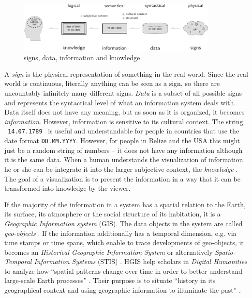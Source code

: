 \begin{figure}[ht]
  \vspace{1em}
  \begin{center}
    \includegraphics[width=0.9\textwidth]{graphics/basics/hgis/information}
  \end{center}
  \caption{signs, data, information and knowledge}
  \label{fig:information}
\end{figure}

A \emph{sign} is the physical representation of something in the real world. Since the real world is continuous, literally anything can be seen as a sign, so there are uncountably infinitely many different signs. \emph{Data} is a subset of all possible signs and represents the syntactical level of what an information system deals with. Data itself does not have any meaning, but as soon as it is organized, it becomes \emph{information}. However, information is sensitive to its cultural context. The string ~\texttt{14.07.1789}~ is useful and understandable for people in countries that use the date format \texttt{DD.MM.YYYY}. However, for people in Belize and the USA this might just be a random string of numbers -- it does not have any  information although it is the same data. When a human understands the visualization of information he or she can be integrate it into the larger subjective context, the \emph{knowledge} \cite{nake}. The goal of a visualization is to present the information in a way that it can be transformed into knowledge by the viewer.

If the majority of the information in a system has a spatial relation to the Earth, its surface, its atmosphere or the social structure of its habitation, it is a \emph{Geographic Information system} (GIS). The data objects in the system are called \emph{geo-objects}
\cite{bolstad2008gis}.
If the information additionally has a temporal dimension, e.g. via time stamps or time spans, which enable to trace developments of geo-objects, it becomes an \emph{Historical Geographic Information System}
\cite{gregory2014toward}
or alternatively \emph{Spatio-Temporal Information Systems} (STIS)
\cite{pelekis04stdms}.
HGIS help scholars in \emph{Digital Humanities} to analyze how ``spatial patterns change over time in order to better understand large-scale Earth processes''
\cite{peuquet99}.
Their purpose is to situate ``history in its geographical context and using geographic information to illuminate the past''
\cite[p. 3]{knowles2008placing}.

